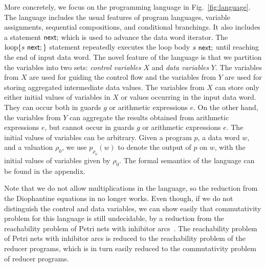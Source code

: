 More concretely, we focus on the programming language in Fig.~\ref{fig:language}. The language includes the usual features of program languages, variable assignments, sequential compositions, and conditional branchings. It also includes a statement $\mathsf{next};$ which is used to advance the data word iterator. The $\loopL{s\ \nnext;}$ statement repeatedly executes the loop body $s\ \mathsf{next};$ until reaching the end of input data word.
The novel feature of the language is that we partition the variables into two sets: \emph{control variables} $X$ and \emph{data variables} $Y$.
The variables from $X$ are used for guiding the control flow and the variables from $Y$ are used for storing aggregated intermediate data values.
The variables from $X$ can store only either initial values of variables in $X$ or values  occurring in the input data word. They can occur both in guards $g$ or arithmetic expressions $e$.
On the other hand, the variables from $Y$ can aggregate the results obtained from arithmetic expressions $e$, but cannot occur in guards $g$ or arithmetic expressions $e$. The initial values of variables can be arbitrary.
Given a program $p$, a data word $w$, and a valuation $\rho_0$, we use $p_{\rho_0}(w)$ to denote the output of $p$ on $w$, with the initial values of variables given by $\rho_0$. The formal semantics of the language can be found in the appendix. 


Note that we do not allow multiplications in the language, so the reduction from the Diophantine equations in \cite{CHSW15} no longer works. Even though, if we do not distinguish the control and data variables, we can show easily that commutativity problem for this language is still undecidable, by a reduction from the reachability problem of Petri nets with inhibitor arcs~\cite{Min71,Rei08}.
The reachability problem of Petri nets with inhibitor arcs is reduced to the reachability problem of the reducer programs, which is in turn easily reduced to the commutativity problem of reducer programs.

